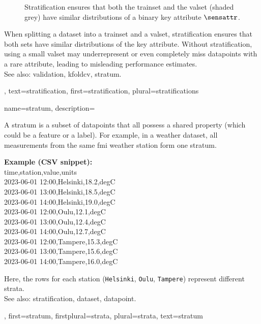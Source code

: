 {{\begin{figure}[H]
 	\caption{Stratification ensures that both the \gls{trainset} and the \gls{valset} 
	(shaded grey) have similar 
 		distributions of a binary key attribute $\sensattr$.}
 \end{figure}
  When splitting a \gls{dataset} into a \gls{trainset} and a \gls{valset}, 
  stratification ensures that both sets have similar distributions of the key attribute. 
  Without stratification, using a small \gls{valset} may underrepresent or 
  even completely miss \glspl{datapoint} with a rare attribute, leading to misleading 
  performance estimates.\\ 
  See also: \gls{validation}, \gls{kfoldcv}, \gls{stratum}.},
  text={stratification},
  first={stratification},
  plural={stratifications}%
}

{name={stratum},
	description={
	A stratum is a subset of \glspl{datapoint} that all 
	possess a shared property (which could be a \gls{feature} or a \gls{label}). 
	For example, in a weather \gls{dataset}, all measurements from the same 
	\gls{fmi} weather station form one stratum.\\[0.5em]
	\begin{center}
\textbf{Example (CSV snippet):}\\
  {\ttfamily
  time,station,value,units\\
  2023-06-01 12:00,Helsinki,18.2,degC\\
  2023-06-01 13:00,Helsinki,18.5,degC\\
  2023-06-01 14:00,Helsinki,19.0,degC\\
  2023-06-01 12:00,Oulu,12.1,degC\\
  2023-06-01 13:00,Oulu,12.4,degC\\
  2023-06-01 14:00,Oulu,12.7,degC\\
  2023-06-01 12:00,Tampere,15.3,degC\\
  2023-06-01 13:00,Tampere,15.6,degC\\
  2023-06-01 14:00,Tampere,16.0,degC
  }
	\end{center} 
	Here, the rows for each station (\texttt{Helsinki}, \texttt{Oulu}, \texttt{Tampere}) 
	represent different strata.\\ 
	See also: \gls{stratification}, \gls{dataset}, \gls{datapoint}.},
  first={stratum},
  firstplural={strata},
 plural={strata}, 
 text={stratum}
}


